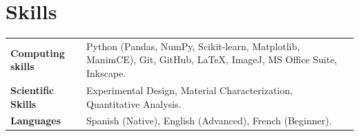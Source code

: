 \documentclass[a4paper,12pt]{article}
\begin{document}
\section{Skills}
\begin{tabularx}{\linewidth}{@{}l X@{}}
\textbf{Computing skills} & Python (Pandas, NumPy, Scikit-learn, Matplotlib, ManimCE), Git, GitHub, \LaTeX, ImageJ, MS Office Suite, Inkscape. \\
\textbf{Scientific Skills} & Experimental Design, Material Characterization, Quantitative Analysis.\\
\textbf{Languages} & Spanish (Native), English (Advanced), French (Beginner). \\  
\end{tabularx}

\vfill
{}
\end{document}
